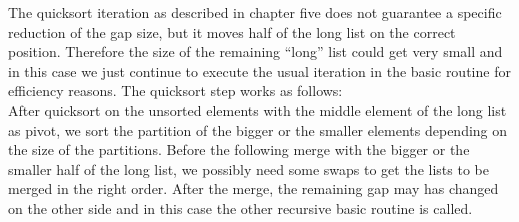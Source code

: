\documentclass[11pt,pdftex,a4paper, twocolumn]{article}
\begin{document}
The quicksort iteration as described in chapter five does not guarantee a specific reduction of the gap size, but it moves half of the long list on the correct position. Therefore the size of the remaining “long” list could get very small and in this case we just continue to execute the usual iteration in the basic routine for efficiency reasons. The quicksort step works as follows: \\
After quicksort on the unsorted elements with the middle element of the long list as pivot, we sort the partition of the bigger or the smaller elements depending on the size of the partitions. Before the following merge with the bigger or the smaller half of the long list, we possibly need some swaps to get the lists to be merged in the right order. After the merge, the remaining gap may has changed on the other side and in this case the other recursive basic routine is called.
\end{document}
